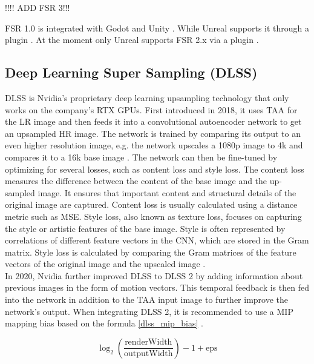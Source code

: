 \documentclass[letterpaper, 10 pt, conference]{ieeeconf}  %
\begin{document}
!!!! ADD FSR 3!!!

FSR 1.0 is integrated with Godot \cite{fsr1_godot} and Unity \cite{fsr1_unity}. While Unreal supports it through a plugin \cite{fsr1_unreal}.
At the moment only Unreal supports FSR 2.x via a plugin \cite{fsr2.x_unreal}.

\subsection{Deep Learning Super Sampling (DLSS)}

DLSS is Nvidia's proprietary deep learning upsampling technology that only works on the company's RTX GPUs.
First introduced in 2018, it uses TAA for the LR image and then feeds it into a convolutional autoencoder network to get an upsampled HR image.
The network is trained by comparing its output to an even higher resolution image, e.g. the network upscales a 1080p image to 4k and compares it to a 16k base image \cite{dlss_slide_1}.
The network can then be fine-tuned by optimizing for several losses, such as content loss and style loss.
The content loss measures the difference between the content of the base image and the up-sampled image.
It ensures that important content and structural details of the original image are captured.
Content loss is usually calculated using a distance metric such as MSE.
Style loss, also known as texture loss, focuses on capturing the style or artistic features of the base image.
Style is often represented by correlations of different feature vectors in the CNN, which are stored in the Gram matrix.
Style loss is calculated by comparing the Gram matrices of the feature vectors of the original image and the upscaled image \cite{liu2021variational}.\\
In 2020, Nvidia further improved DLSS to DLSS 2 by adding information about previous images in the form of motion vectors. 
This temporal feedback is then fed into the network in addition to the TAA input image to further improve the network's output.
When integrating DLSS 2, it is recommended to use a MIP mapping bias based on the formula \ref{dlss_mip_bias} \cite{dlss_slide_2}.

\begin{equation}
    \log_2\left(\frac{\text{{renderWidth}}}{\text{{outputWidth}}}\right) - 1 + \text{{eps}}
    \label{dlss_mip_bias}
\end{equation}
\end{document}
